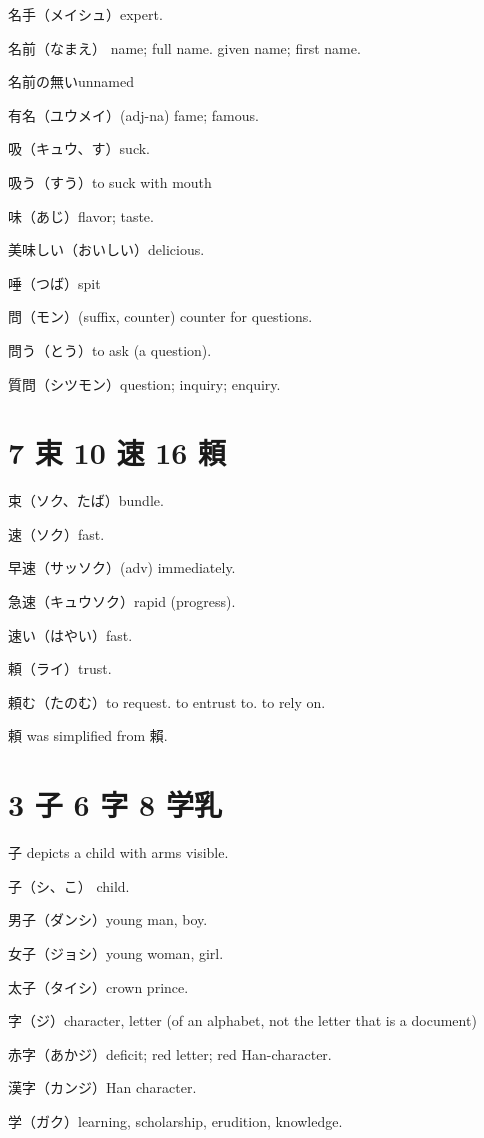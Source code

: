 名手（メイシュ）expert.

名前（なまえ）
name; full name.
given name; first name.

名前の無いunnamed

有名（ユウメイ）(adj-na) fame; famous.

吸（キュウ、す）suck.

吸う（すう）to suck with mouth

味（あじ）flavor; taste.

美味しい（おいしい）delicious.

唾（つば）spit

問（モン）(suffix, counter) counter for questions.

問う（とう）to ask (a question).

質問（シツモン）question; inquiry; enquiry.

\section{7 束 10 速 16 頼}

束（ソク、たば）bundle.

速（ソク）fast.

早速（サッソク）(adv) immediately.

急速（キュウソク）rapid (progress).

速い（はやい）fast.

頼（ライ）trust.

頼む（たのむ）to request. to entrust to. to rely on.

頼 was simplified from 賴.

\section{3 子 6 字 8 学乳}

子 depicts a child with arms visible.

子（シ、こ） child.

男子（ダンシ）young man, boy.

女子（ジョシ）young woman, girl.

太子（タイシ）crown prince.

字（ジ）character, letter (of an alphabet, not the letter that is a document)

赤字（あかジ）deficit; red letter; red Han-character.

漢字（カンジ）Han character.

学（ガク）learning, scholarship, erudition, knowledge.


